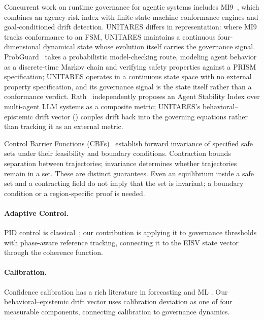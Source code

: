 \documentclass[11pt,twocolumn]{article}
\begin{document}
Concurrent work on runtime governance for agentic systems includes
MI9~\cite{wang2025mi9}, which combines an agency-risk index with
finite-state-machine conformance engines and goal-conditioned drift
detection. UNITARES differs in representation: where MI9 tracks
conformance to an FSM, UNITARES maintains a continuous four-dimensional
dynamical state whose evolution itself carries the governance signal.
ProbGuard~\cite{wang2025probguard} takes a probabilistic
model-checking route, modeling agent behavior as a discrete-time
Markov chain and verifying safety properties against a PRISM
specification; UNITARES operates in a continuous state space
with no external property specification, and its governance signal
is the state itself rather than a conformance verdict.
Rath~\cite{rath2026agentdrift} independently proposes an Agent
Stability Index over multi-agent LLM systems as a composite metric;
UNITARES's behavioral--epistemic drift vector () couples
drift back into the governing equations rather than tracking it as an
external metric.

Control Barrier Functions (CBFs)~\cite{ames2019control} establish
forward invariance of specified safe sets under their feasibility
and boundary conditions. Contraction bounds separation between
trajectories; invariance determines whether trajectories remain in
a set. These are distinct guarantees. Even an equilibrium inside
a safe set and a contracting field do not imply that the set is
invariant; a boundary condition or a region-specific proof is needed.

\paragraph{Adaptive Control.}
PID control is classical~\cite{astrom2008feedback}; our contribution
is applying it to governance thresholds with phase-aware reference
tracking, connecting it to the EISV state vector through the
coherence function.

\paragraph{Calibration.}
Confidence calibration has a rich literature in forecasting and ML
\cite{guo2017calibration,niculescu2005predicting}. Our behavioral--epistemic drift
vector uses calibration deviation as one of four measurable components,
connecting calibration to governance dynamics.

\end{document}
